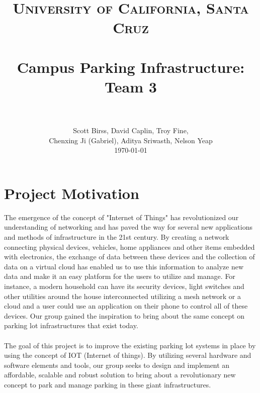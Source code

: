 \documentclass[paper=a4, fontsize=12pt]{scrartcl}
\title{
		\usefont{OT1}{bch}{b}{n}
		\normalfont \large \textsc{University of California, Santa Cruz} \\ [25pt]
		\horrule{0.5pt} \\[0.4cm]
		\huge Campus Parking Infrastructure: Team 3 \\
		\horrule{2pt} \\[0.5cm]
}
\author{
		\normalfont 								%
        Scott Birss, David Caplin, Troy Fine,
        \\Chenxing Ji (Gabriel), Aditya Sriwasth, Nelson Yeap\\[-3pt]		
        \normalsize
        \today
}
\date{}
\numberwithin{equation}{section}		%
\numberwithin{figure}{section}			%
\numberwithin{table}{section}				%
\begin{document}
\maketitle
\clearpage
\pagestyle{fancy} %
\tableofcontents %
\clearpage
\section{Project Motivation}
The emergence of the concept of "Internet of Things" has revolutionized our understanding of networking and has paved the way for several new applications and methods of infrastructure in the 21st century. By creating a network connecting physical devices, vehicles, home appliances and other items embedded with electronics, the exchange of data between these devices and the collection of data on a virtual cloud has enabled us to use this information to analyze new data and make it an easy platform for the users to utilize and manage. For instance, a modern household can have its security devices, light switches and other utilities around the house interconnected utilizing a mesh network or a cloud and a user could use an application on their phone to control all of these devices. Our group gained the inspiration to bring about the same concept on parking lot infrastructures that exist today.
\\\\
The goal of this project is to improve the existing parking lot systems in place by using the concept of IOT (Internet of things). By utilizing several hardware and software elements and tools, our group seeks to design and implement an affordable, scalable and robust solution to bring about a revolutionary new concept to park and manage parking in these giant infrastructures.
\end{document}
